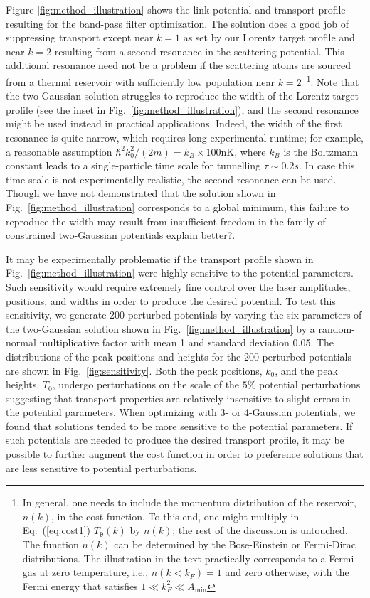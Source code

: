 \documentclass[twocolumn,amsmath,amssymb,showpacs,prl,superscriptaddress,aps]{revtex4-1}
\begin{document}
Figure \ref{fig:method_illustration} shows the link potential and transport profile resulting for the band-pass filter optimization. The solution does a good job of suppressing transport except near $k=1$ as set by our Lorentz target profile and near $k=2$ resulting from a second resonance in the scattering potential. This additional resonance need not be a problem if the scattering atoms are sourced from a thermal reservoir with sufficiently low population near $k=2$~\footnote{In general, one needs to include the momentum distribution of the reservoir, $n(k)$,
in the cost function. To this end, one might multiply in Eq.~(\ref{eq:cost1}) $T_{\bm{\theta}}(k)$ by $n(k)$; the rest of the discussion is untouched.
The function $n(k)$ can be determined by the Bose-Einstein or Fermi-Dirac distributions. The illustration in the text practically corresponds to a Fermi gas 
at zero temperature, i.e., $n(k<k_F)=1$ and zero otherwise, with the Fermi energy that satisfies $1\ll k_F^2 \ll A_\mathrm{min}$}.
 {\color{green}  Note that the two-Gaussian solution struggles to reproduce the width of the Lorentz target profile (see the inset in Fig.~\ref{fig:method_illustration}), and the second resonance might be used instead in practical applications. Indeed, the width of the first resonance is quite narrow, 
which requires long experimental runtime; for example, a reasonable assumption $\hbar^2k_0^2/(2m)=k_B\times 100$nK, where $k_B$ is the Boltzmann constant leads to 
a single-particle time scale for tunnelling $\tau\sim 0.2 s$. In case this time scale is not experimentally realistic, the second resonance 
can be used.} Though we have not demonstrated that the solution shown in Fig.~\ref{fig:method_illustration} corresponds to a global minimum, this failure to reproduce the width may result from insufficient freedom in the family of constrained two-Gaussian potentials {\color{blue} explain better?}.



It may be experimentally problematic if the transport profile shown in Fig.~\ref{fig:method_illustration} were highly sensitive to the potential parameters. Such sensitivity would require extremely fine control over the laser amplitudes, positions, and widths in order to produce the desired potential. To test this sensitivity, we generate 200 perturbed potentials by varying the six parameters of the two-Gaussian solution shown in Fig.~\ref{fig:method_illustration} by a random-normal multiplicative factor with mean 1 and standard deviation 0.05. The distributions of the peak positions and heights for the 200 perturbed potentials are shown in Fig.~\ref{fig:sensitivity}. Both the peak positions, $k_0$, and the peak heights, $T_0$, undergo perturbations on the scale of the $5\%$  potential perturbations suggesting that transport properties are relatively insensitive to slight errors in the potential parameters. When optimizing with 3- or 4-Gaussian potentials, we found that solutions tended to be more sensitive to the potential parameters. If such potentials are needed to produce the desired transport profile, it may be possible to further augment the cost function in order to preference solutions that are less sensitive to potential perturbations.
\end{document}
